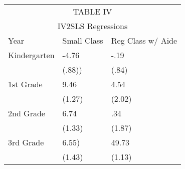 \begin{tabular}[H]{ |p{4cm}p{2cm}p{2cm}|}
 \hline
 \multicolumn{3}{|c|}{TABLE IV} \\
 \multicolumn{3}{|c|}{IV2SLS Regressions}\\
 \hline
 \hline
   Year & Small Class & Reg Class w/ Aide \\
 \hline

Kindergarten & -4.76&  -.19 \\
&(.88))&(.84)\\
1st Grade & 9.46 & 4.54\\
&(1.27)&(2.02)\\
2nd Grade& 6.74&.34\\
&(1.33)&(1.87)\\
3rd Grade&6.55)&49.73\\
&(1.43)&(1.13)\\
\hline
\end{tabular}

